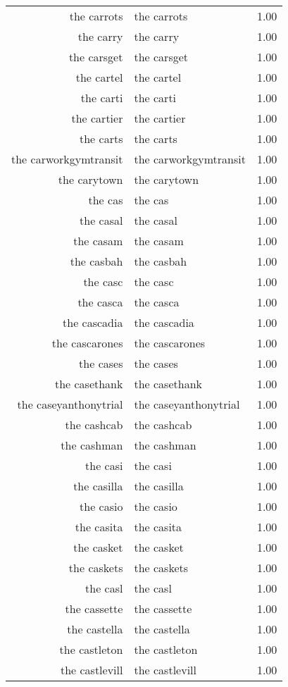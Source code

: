 \begin{table}[ht]
\begin{tabular}{rlr}
  the carrots & the carrots & 1.00 \\ 
  the carry & the carry & 1.00 \\ 
  the carsget & the carsget & 1.00 \\ 
  the cartel & the cartel & 1.00 \\ 
  the carti & the carti & 1.00 \\ 
  the cartier & the cartier & 1.00 \\ 
  the carts & the carts & 1.00 \\ 
  the carworkgymtransit & the carworkgymtransit & 1.00 \\ 
  the carytown & the carytown & 1.00 \\ 
  the cas & the cas & 1.00 \\ 
  the casal & the casal & 1.00 \\ 
  the casam & the casam & 1.00 \\ 
  the casbah & the casbah & 1.00 \\ 
  the casc & the casc & 1.00 \\ 
  the casca & the casca & 1.00 \\ 
  the cascadia & the cascadia & 1.00 \\ 
  the cascarones & the cascarones & 1.00 \\ 
  the cases & the cases & 1.00 \\ 
  the casethank & the casethank & 1.00 \\ 
  the caseyanthonytrial & the caseyanthonytrial & 1.00 \\ 
  the cashcab & the cashcab & 1.00 \\ 
  the cashman & the cashman & 1.00 \\ 
  the casi & the casi & 1.00 \\ 
  the casilla & the casilla & 1.00 \\ 
  the casio & the casio & 1.00 \\ 
  the casita & the casita & 1.00 \\ 
  the casket & the casket & 1.00 \\ 
  the caskets & the caskets & 1.00 \\ 
  the casl & the casl & 1.00 \\ 
  the cassette & the cassette & 1.00 \\ 
  the castella & the castella & 1.00 \\ 
  the castleton & the castleton & 1.00 \\ 
  the castlevill & the castlevill & 1.00 \\ 

\end{tabular}
\end{table}
